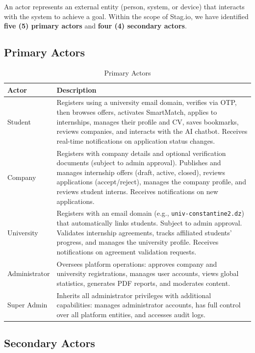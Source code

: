 An actor represents an external entity (person, system, or device) that interacts with the system to achieve a goal. Within the scope of Stag.io, we have identified \textbf{five (5) primary actors} and \textbf{four (4) secondary actors}.

\subsection{Primary Actors}

\begin{table}[H]
\centering
\caption{Primary Actors}
\label{tab:actors}
\begin{tabular}{|p{2.5cm}|p{11.5cm}|}
\hline
\textbf{Actor} & \textbf{Description} \\
\hline
Student & Registers using a university email domain, verifies via OTP, then browses offers, activates SmartMatch, applies to internships, manages their profile and CV, saves bookmarks, reviews companies, and interacts with the AI chatbot. Receives real-time notifications on application status changes. \\
\hline
Company & Registers with company details and optional verification documents (subject to admin approval). Publishes and manages internship offers (draft, active, closed), reviews applications (accept/reject), manages the company profile, and reviews student interns. Receives notifications on new applications. \\
\hline
University & Registers with an email domain (e.g., \texttt{univ-constantine2.dz}) that automatically links students. Subject to admin approval. Validates internship agreements, tracks affiliated students' progress, and manages the university profile. Receives notifications on agreement validation requests. \\
\hline
Administrator & Oversees platform operations: approves company and university registrations, manages user accounts, views global statistics, generates PDF reports, and moderates content. \\
\hline
Super Admin & Inherits all administrator privileges with additional capabilities: manages administrator accounts, has full control over all platform entities, and accesses audit logs. \\
\hline
\end{tabular}
\end{table}

\subsection{Secondary Actors}

